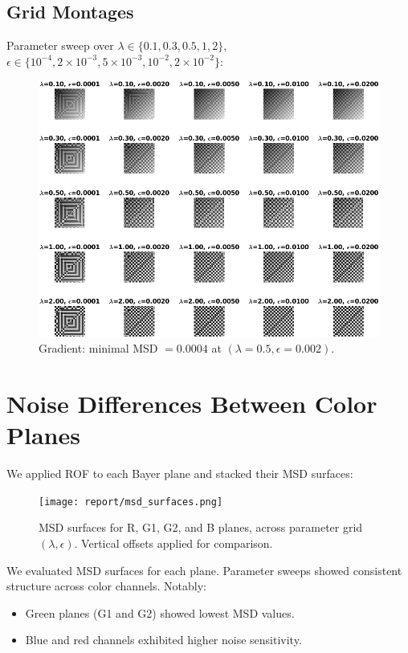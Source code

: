 \documentclass[11pt]{article}
\begin{document}
\subsection*{Grid Montages}
Parameter sweep over \(\lambda\in\{0.1,0.3,0.5,1,2\}\), \(\epsilon\in\{10^{-4},2\times10^{-3},5\times10^{-3},10^{-2},2\times10^{-2}\}\):
\begin{figure}[h!]
  \centering
  \includegraphics[width=\textwidth]{../utils/results/test_grid_5x5/gradient_grid.png}
  \caption{Gradient: minimal MSD \(=0.0004\) at \((\lambda=0.5,\epsilon=0.002)\).}
\end{figure}

\section*{Noise Differences Between Color Planes}
We applied ROF to each Bayer plane and stacked their MSD surfaces:



\begin{figure}[h!]
    \centering
    \texttt{[image: report/msd\_surfaces.png]}
    \caption{MSD surfaces for R, G1, G2, and B planes, across parameter grid $(\lambda, \epsilon)$. Vertical offsets applied for comparison.}
\end{figure}
We evaluated MSD surfaces for each plane. Parameter sweeps showed consistent structure across color channels. Notably:

\begin{itemize}
  \item Green planes (G1 and G2) showed lowest MSD values.
  \item Blue and red channels exhibited higher noise sensitivity.
\end{itemize}
\end{document}
